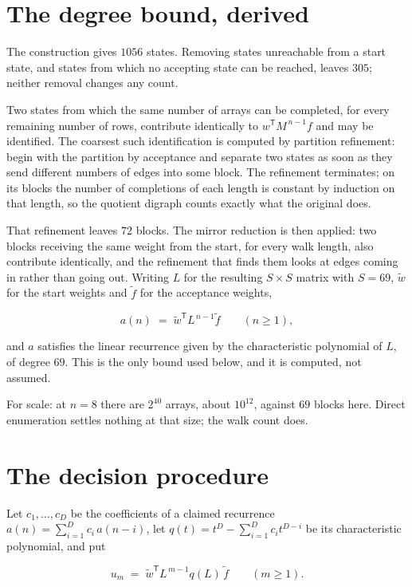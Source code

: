 \documentclass[11pt]{article}
\theoremstyle{definition}
\begin{document}
\section{The degree bound, derived}

The construction gives $1056$ states. Removing states unreachable from a start state, and states from which no accepting state can be reached, leaves $305$; neither removal changes any count.

Two states from which the same number of arrays can be completed, for every remaining number of rows, contribute identically to $w^{\mathsf T}M^{\,n-1}f$ and may be identified. The coarsest such identification is computed by partition refinement: begin with the partition by acceptance and separate two states as soon as they send different numbers of edges into some block. The refinement terminates; on its blocks the number of completions of each length is constant by induction on that length, so the quotient digraph counts exactly what the original does.

That refinement leaves $72$ blocks. The mirror reduction is then applied: two blocks receiving the same weight from the start, for every walk length, also contribute identically, and the refinement that finds them looks at edges coming in rather than going out. Writing $L$ for the resulting $S \times S$ matrix with $S = 69$, $\tilde w$ for the start weights and $\tilde f$ for the acceptance weights,

\[a(n) \;=\; \tilde w^{\mathsf T} L^{\,n-1} \tilde f \qquad (n \ge 1),\]

and $a$ satisfies the linear recurrence given by the characteristic polynomial of $L$, of degree $69$. This is the only bound used below, and it is computed, not assumed.

For scale: at $n = 8$ there are $2^{40}$ arrays, about $10^{12}$, against $69$ blocks here. Direct enumeration settles nothing at that size; the walk count does.

\section{The decision procedure}

Let $c_1,\dots,c_D$ be the coefficients of a claimed recurrence $a(n) = \sum_{i=1}^{D} c_i\,a(n-i)$, let $q(t) = t^{D} - \sum_{i=1}^{D} c_i t^{D-i}$ be its characteristic polynomial, and put

\[u_m \;=\; \tilde w^{\mathsf T} L^{\,m-1} q(L)\,\tilde f \qquad (m \ge 1).\]
\end{document}
